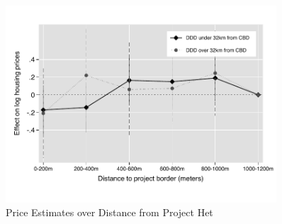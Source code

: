 \documentclass[12pt]{article}
\begin{document}
\begin{figure}
\caption{Price Estimates over Distance from Project Het}\label{figure:distplot_het}
\centering
\includegraphics[width=0.9\textwidth,trim={0cm .7cm 0cm 0.7cm},clip=true]{figures/price_regs_DDDplot_het_3}
\vspace{-2mm}
\end{figure}


% 

% 

\end{document}
